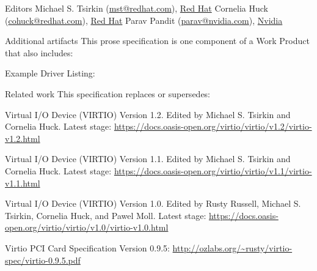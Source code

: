\begin{titlepage}
\begin{oasistitlesection}{Editors}
Michael S. Tsirkin (\href{mailto:mst@redhat.com}{mst@redhat.com}), \href{https://www.redhat.com/}{Red Hat}\newline
Cornelia Huck (\href{mailto:cohuck@redhat.com}{cohuck@redhat.com}), \href{https://www.redhat.com/}{Red Hat}\newline
Parav Pandit (\href{mailto:parav@nvidia.com}{parav@nvidia.com}), \href{https://www.nvidia.com/}{Nvidia}\newline
\end{oasistitlesection}


\begin{oasistitlesection}{Additional artifacts}
This prose specification is one component of a Work Product that also includes:
\begin{itemize*}
	\item Example Driver Listing: \newline
	\virtiourllistings
\end{itemize*}
\end{oasistitlesection}

\begin{oasistitlesection}{Related work}
This specification replaces or supersedes:
\begin{itemize*}
	\item Virtual I/O Device (VIRTIO) Version 1.2. Edited by Michael S. Tsirkin and Cornelia Huck. Latest stage:\newline
	\url{https://docs.oasis-open.org/virtio/virtio/v1.2/virtio-v1.2.html}
	\item Virtual I/O Device (VIRTIO) Version 1.1. Edited by Michael S. Tsirkin and Cornelia Huck. Latest stage:\newline
	\url{https://docs.oasis-open.org/virtio/virtio/v1.1/virtio-v1.1.html}
	\item Virtual I/O Device (VIRTIO) Version 1.0. Edited by Rusty Russell, Michael S. Tsirkin, Cornelia Huck, and Pawel
 Moll. Latest stage:\newline
	\url{https://docs.oasis-open.org/virtio/virtio/v1.0/virtio-v1.0.html}
	\item Virtio PCI Card Specification Version 0.9.5:\newline
	\url{http://ozlabs.org/~rusty/virtio-spec/virtio-0.9.5.pdf}
\end{itemize*}
\end{oasistitlesection}
\vspace{-0.2in}


\end{titlepage}
